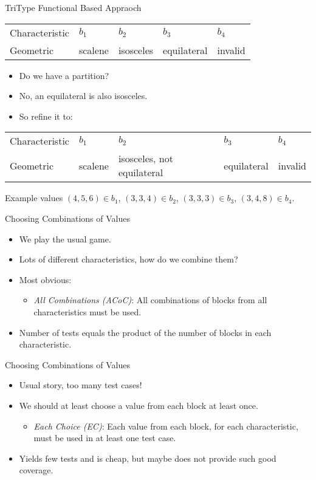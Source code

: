 \documentclass{beamer}
\begin{document}
\begin{frame}{TriType  Functional Based Appraoch}
  \begin{tabular}{||l|l|l|l|l||}\hline 
    Characteristic & $b_1$  & $b_2$ & $b_3$ & $b_4$\\
    Geometric  &  scalene & isosceles &
    equilateral & invalid \\
    \hline
  \end{tabular}
  \begin{itemize}
  \item Do we have a partition? 
  \item No, an equilateral is also isosceles.
  \item So refine it to:
  \end{itemize}
{\small
  \begin{tabular}{||l|l|l|l|l||}\hline 
    Characteristic & $b_1$  & $b_2$ & $b_3$ & $b_4$\\
    Geometric  &  scalene & isosceles, not equilateral &
    equilateral & invalid \\
    \hline
  \end{tabular}
}
Example values $(4,5,6) \in b_1$,  $(3,3,4) \in b_2$, $(3,3,3) \in
b_3$, $(3,4,8) \in b_4$.
\end{frame}
\begin{frame}{Choosing Combinations of Values}
  
  \begin{itemize}
  \item We play the usual game.
  \item Lots of different characteristics, how do we combine them?
  \item Most obvious:
    \begin{itemize}
    \item {\em All Combinations (ACoC)}: All combinations of blocks from all
      characteristics must be used.
    \end{itemize}
  \item Number of tests equals the product of the number of blocks in each
    characteristic. 
  \end{itemize}
  \end{frame}
\begin{frame}{Choosing Combinations of Values}
  \begin{itemize}
  \item Usual story, too many test cases!
  \item We should at least choose a value from each block at least once.
    \begin{itemize}
    \item {\em Each Choice (EC)}: Each value from each block, for each
      characteristic, must be used in at least one test case.
    \end{itemize}
  \item Yields few tests and is cheap, but maybe does not provide such good coverage.
  \end{itemize}
\end{frame}
\end{document}
